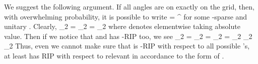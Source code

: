 We suggest the following argument.
If all angles  are on exactly on the grid, then, with overwhelming probability, it is possible to write
 {
\NC {}
=\NC {}    ^\Adj \NR
}
for some -sparse  and unitary .
Clearly,
 {
\NC {} _2
=\NC {} _2 \NR
%
\NC =\NC {} _2 \NR
}
where  denotes elementwise taking absolute value.
Then if we notice that  and  has -RIP too, we see
 {
\NC \NC {} _2 \NR
%
\NC =\NC {} _2 \NR
%
\NC =\NC {} _2 \NR
%
\NC =\NC {} _2 \D
    _2 \NR
%
\NC \eqsim \NC {} _2  \NR
}
Thus, even we cannot make sure that  is -RIP with respect to all possible 's, at least  has RIP with respect to relevant  in accordance to the form of .

\stopsubsection

\stopsection
